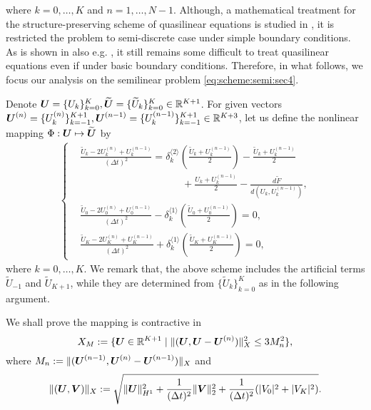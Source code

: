 \documentclass[dvipdfmx-if-dvi,autodetect-engine,ja=standard]{amsart}
\numberwithin{equation}{section} %
\def\vect#1{\mbox{\boldmath $#1$}} %
\begin{document}
where
$k=0,\ldots,K$
and
$n=1,\ldots,N-1$.
Although, a mathematical treatment for the structure-preserving scheme of quasilinear equations is studied in \cite{yo-ka}, 
it is restricted the problem to semi-discrete case under simple boundary conditions. 
As is shown in also e.g. \cite{ko-lu}, it still remains some difficult to treat quasilinear equations even if under 
basic boundary conditions. 
Therefore, in what follows,
we focus our analysis on the
semilinear problem \eqref{eq:scheme:semi:sec4}.


Denote
$\vect{U} = \{ U_k \}_{k=0}^{K},
\widetilde{\vect{U}} = \{ \widetilde{U}_k \}_{k=0}^{K}
\in \mathbb{R}^{K+1}$.
For given vectors
$\vect{U}^{(n)} = \{ U_k^{(n)} \}_{k=-1}^{K+1},
\vect{U}^{(n-1)} = \{ U_k^{(n-1)} \}_{k=-1}^{K+1}
\in \mathbb{R}^{K+3}$,
let us define the nonlinear mapping $\Phi:\vect{U} \mapsto \widetilde{\vect{U}}$ by 
\begin{align}\label{eq:nmp}
    \left\{
    \begin{alignedat}{1}
    &\frac{\widetilde{U}_k - 2 U_k^{(n)} +  U_k^{(n-1)}}{(\Delta t)^2}  
    = \delta_k^{\langle 2 \rangle}
    \left(
        \frac{\widetilde{U}_k+U_k^{(n-1)}}{2}
    \right)
    - \frac{\widetilde{U}_k+U_k^{(n-1)}}{2} \\
    &\ \qquad \qquad \qquad \qquad \qquad + \frac{U_k+U_k^{(n-1)}}{2}
    - \frac{d \tilde{F}}{d(U_k, U_k^{(n-1)})},\\
    &\frac{\widetilde{U}_0 - 2 U_0^{(n)} +  U_0^{(n-1)}}{(\Delta t)^2} 
        - \delta_k^{\langle 1 \rangle}
        \left(
            \frac{\widetilde{U}_0+U_0^{(n-1)}}{2}
        \right)
        = 0,\\
    &\frac{\widetilde{U}_K - 2 U_K^{(n)} +  U_K^{(n-1)}}{(\Delta t)^2} 
       + \delta_k^{\langle 1 \rangle}
        \left(
            \frac{\widetilde{U}_K+U_K^{(n-1)}}{2}
        \right)
        = 0,
    \end{alignedat}
    \right.
\end{align}
where
$k=0,\ldots,K$.
We remark that,
the above scheme includes
the artificial terms
$\widetilde{U}_{-1}$
and
$\widetilde{U}_{K+1}$,
while they are determined from
$\{ \widetilde{U}_k \}_{k=0}^{K}$
as in the following argument.


We shall prove the mapping is contractive in 
\[
X_M := \{ \vect{U} \in \mathbb{R}^{K+1} \mid \| (\vect{U}, \vect{U} - \vect{U}^{(n)}) \|_X^2 \leq 3 M_n^2 \}, 
\]
where
$M_n := \| (\vect{U}^{(n-1)}, \vect{U}^{(n)}-\vect{U}^{(n-1)}) \|_X$
and 
\[
\| (\vect{U}, \vect{V}) \|_X := \sqrt{\| \vect{U} \|_{H^1}^2 + \frac{1}{(\Delta t)^2} \| \vect{V} \|_{2}^2
+ \frac{1}{(\Delta t)^2}( |V_0|^2 + |V_K|^2 )
}. 
\]
\end{document}
